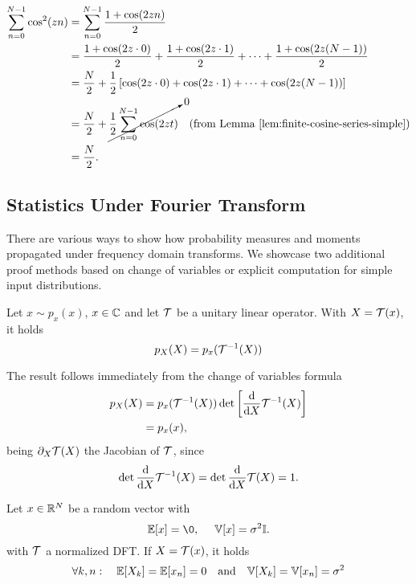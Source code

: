 \begin{equation}
    \begin{aligned}
    \sum_{n=0}^{N-1}  \cos^2(z n )  &= \sum_{n=0}^{N-1} \frac{1 + \cos( 2 z n )}{2} \\
    &= \frac{1 + \cos(2 z \cdot 0)}{2} + \frac{1 + \cos(2 z \cdot 1)}{2} + \dots + \frac{1 + \cos(2 z (N-1))}{2} \\
    &= \frac{N}{2} + \frac{1}{2}  \left[ \cos(2 z \cdot 0) + \cos(2 z \cdot 1) + \dots + \cos(2 z (N-1)) \right] \\
    &= \frac{N}{2} + \cancelto{0}{\frac{1}{2} \sum_{n=0}^{N-1} \cos(2 z t)} \quad \text{(from Lemma \ref{lem:finite-cosine-series-simple})}\\
    &= \frac{N}{2}.
    \end{aligned}
\end{equation}
\endproof

%

\subsection{Statistics Under Fourier Transform}
%
There are various ways to show how probability measures and moments propagated under frequency domain transforms. We showcase two additional proof methods based on change of variables or explicit computation for simple input distributions.

\begin{lemma}\label{pres}
    Let $x\sim p_x(x)$, $x\in\mathbb{C}$ and let $\mathcal{T}$ be a unitary linear operator. With $X = \mathcal{T}(x)$, it holds
    \[
        p_X(X) = p_x(\mathcal{T}^{-1}(X))
    \]
\end{lemma}
\proof
    The result follows immediately from the change of variables formula
    \[
        \begin{aligned}
            p_X(X) &= p_x(\mathcal{T}^{-1}(X))\det \left[\frac{\dd}{\dd X}\mathcal{T}^{-1}(X)\right]\\
            & = p_x(x),
        \end{aligned}
    \]
    being $\partial_X\mathcal{T}(X)$ the Jacobian of $\mathcal{T}$, since 
    $$\det\frac{\dd}{\dd X}\mathcal{T}^{-1}(X) = \det\frac{\dd}{\dd X}\mathcal{T}(X) = 1.$$
\endproof
%

%
\begin{lemma}\label{explicit_vp}
Let $x\in\mathbb{R}^N$ be a random vector with 
%
\[
    \bE[x] = \0, \quad~ \mathbb{V}[x] = \sigma^2 \Id.
\]
with $\mathcal{T}$ a normalized DFT. If $X = \mathcal{T}(x)$, it holds
    \[
        \forall k,n: \quad \mathbb{E}[X_k] = \mathbb{E}[x_n] = 0 \quad \text{and} \quad \mathbb{V}[X_k] = \mathbb{V}[x_n] = \sigma^2
    \]
\end{lemma}
\proof

